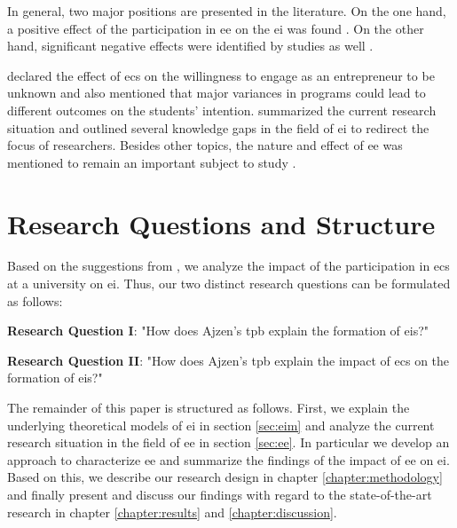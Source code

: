 In general, two major positions are presented in the literature. On the one hand, a positive effect of the participation in \ac{ee} on the \ac{ei} was found \citep{zhao2005mediating,peterman2003enterprise}. On the other hand, significant negative effects were identified by studies as well \citep{lorz2011impact,von2010effects,oosterbeek2010impact}.

\citet{von2010effects} declared the effect of \acp{ec} on the willingness to engage as an entrepreneur to be unknown and also \citet{oosterbeek2010impact} mentioned that major variances in programs could lead to different outcomes on the students' intention.
\citet{fayolle2014future} summarized the current research situation and outlined several knowledge gaps in the field of \ac{ei} to redirect the focus of researchers. Besides other topics, the nature and effect of \ac{ee} was mentioned to remain an important subject to study \citep{linan2015systematic}.

\section{Research Questions and Structure}
Based on the suggestions from \citet{fayolle2014future}, we analyze the impact of the participation in \acp{ec} at a university on \ac{ei}. Thus, our two distinct research questions can be formulated as follows: 
\begin{center}
\textbf{Research Question I}: "How does Ajzen's \acl{tpb} explain the formation of \aclp{ei}?" 
\end{center}
\begin{center}
\textbf{Research Question II}:  "How does Ajzen's \acl{tpb} explain the impact of \aclp{ec} on the formation of \aclp{ei}?"
\end{center}


The remainder of this paper is structured as follows. First, we explain the underlying theoretical models of \ac{ei} in section \ref{sec:eim} and analyze the current research situation in the field of \ac{ee} in section \ref{sec:ee}. In particular we develop an approach to characterize \ac{ee} and summarize the findings of the impact of \ac{ee} on \ac{ei}. Based on this, we describe our research design in chapter \ref{chapter:methodology} and finally present and discuss our findings with regard to the state-of-the-art research in chapter \ref{chapter:results} and \ref{chapter:discussion}.